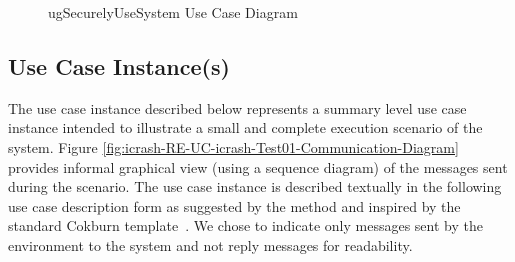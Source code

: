 \begin{figure}
\begin{center}
\end{center}
\caption{\msricrash ugSecurelyUseSystem Use Case Diagram}
\label{fig:icrash-UCM-icrash-ugSecurelyUseSystem}
\end{figure}  
\vspace{0.5cm}

\clearpage

\subsection{Use Case Instance(s)}

The use case instance described below represents a summary level use case instance intended to illustrate a small and complete execution scenario of the \msricrash system. Figure \ref{fig:icrash-RE-UC-icrash-Test01-Communication-Diagram} provides informal graphical view (using a sequence diagram) of the messages sent during the scenario. The use case instance is described textually in the following use case description form as suggested by the \msrmessir method and inspired by the standard Cokburn template~\cite{armour01usecase}. We chose to indicate only messages sent by the environment to the system and not reply messages for readability.



